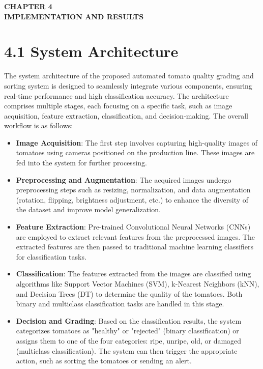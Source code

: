 \documentclass[12pt,a4paper]{report}
\begin{document}
    \newpage
	\begin{center}
	\textbf{\Large CHAPTER 4}\\[0.5cm]
	\textbf{\Large  IMPLEMENTATION AND RESULTS}
\end{center}


\section*{4.1 System Architecture}

\hspace{1cm}The system architecture of the proposed automated tomato quality grading and sorting system is designed to seamlessly integrate various components, ensuring real-time performance and high classification accuracy. The architecture comprises multiple stages, each focusing on a specific task, such as image acquisition, feature extraction, classification, and decision-making. The overall workflow is as follows:

\begin{itemize}
	\item \textbf{Image Acquisition}: The first step involves capturing high-quality images of tomatoes using cameras positioned on the production line. These images are fed into the system for further processing.
	
	\item \textbf{Preprocessing and Augmentation}: The acquired images undergo preprocessing steps such as resizing, normalization, and data augmentation (rotation, flipping, brightness adjustment, etc.) to enhance the diversity of the dataset and improve model generalization.
	
	\item \textbf{Feature Extraction}: Pre-trained Convolutional Neural Networks (CNNs) are employed to extract relevant features from the preprocessed images. The extracted features are then passed to traditional machine learning classifiers for classification tasks.
	
	\item \textbf{Classification}: The features extracted from the images are classified using algorithms like Support Vector Machines (SVM), k-Nearest Neighbors (kNN), and Decision Trees (DT) to determine the quality of the tomatoes. Both binary and multiclass classification tasks are handled in this stage.
	
	\item \textbf{Decision and Grading}: Based on the classification results, the system categorizes tomatoes as "healthy" or "rejected" (binary classification) or assigns them to one of the four categories: ripe, unripe, old, or damaged (multiclass classification). The system can then trigger the appropriate action, such as sorting the tomatoes or sending an alert.
\end{itemize}
\end{document}
